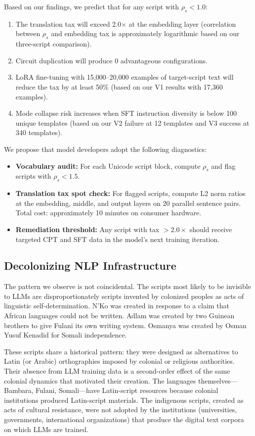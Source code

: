\documentclass[11pt]{article}
\begin{document}
Based on our findings, we predict that for any script with $\rho_s < 1.0$:
\begin{enumerate}
\item The translation tax will exceed 2.0$\times$ at the embedding layer (correlation between $\rho_s$ and embedding tax is approximately logarithmic based on our three-script comparison).
\item Circuit duplication will produce 0 advantageous configurations.
\item LoRA fine-tuning with 15,000--20,000 examples of target-script text will reduce the tax by at least 50\% (based on our V1 results with 17,360 examples).
\item Mode collapse risk increases when SFT instruction diversity is below 100 unique templates (based on our V2 failure at 12 templates and V3 success at 340 templates).
\end{enumerate}

We propose that model developers adopt the following diagnostics:
\begin{itemize}
\item \textbf{Vocabulary audit:} For each Unicode script block, compute $\rho_s$ and flag scripts with $\rho_s < 1.5$.
\item \textbf{Translation tax spot check:} For flagged scripts, compute L2 norm ratios at the embedding, middle, and output layers on 20 parallel sentence pairs. Total cost: approximately 10 minutes on consumer hardware.
\item \textbf{Remediation threshold:} Any script with tax $> 2.0\times$ should receive targeted CPT and SFT data in the model's next training iteration.
\end{itemize}

\subsection{Decolonizing NLP Infrastructure}

The pattern we observe is not coincidental.
The scripts most likely to be invisible to LLMs are disproportionately scripts invented by colonized peoples as acts of linguistic self-determination.
N'Ko was created in response to a claim that African languages could not be written.
Adlam was created by two Guinean brothers to give Fulani its own writing system.
Osmanya was created by Osman Yusuf Kenadid for Somali independence.

These scripts share a historical pattern: they were designed as alternatives to Latin (or Arabic) orthographies imposed by colonial or religious authorities.
Their absence from LLM training data is a second-order effect of the same colonial dynamics that motivated their creation.
The languages themselves---Bambara, Fulani, Somali---have Latin-script resources because colonial institutions produced Latin-script materials.
The indigenous scripts, created as acts of cultural resistance, were not adopted by the institutions (universities, governments, international organizations) that produce the digital text corpora on which LLMs are trained.
\end{document}
